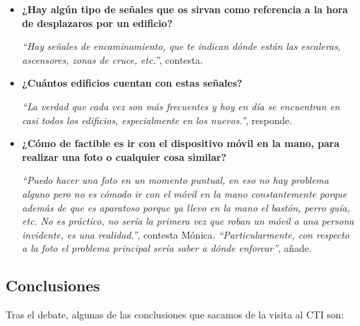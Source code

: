 \begin{itemize}
	\item \textbf{¿Hay algún tipo de señales que os sirvan como referencia a la hora de desplazaros por un edificio?}
	
	\textit{``Hay señales de encaminamiento, que te indican dónde están las escaleras, ascensores, zonas de cruce, etc.''}, contesta.

	\item \textbf{¿Cuántos edificios cuentan con estas señales?}
	
	\textit{``La verdad que cada vez son más frecuentes y hoy en día se encuentran en casi todos los edificios, especialmente en los nuevos.''}, responde.
	
	\item \textbf{¿Cómo de factible es ir con el dispositivo móvil en la mano, para realizar una foto o cualquier cosa similar?}
	
	\textit{``Puedo hacer una foto en un momento puntual, en eso no hay problema alguno pero no es cómodo ir con el móvil en la mano constantemente porque además de que es aparatoso porque ya llevo en la mano el bastón, perro guía, etc. No es práctico, no sería la primera vez que roban un móvil a una persona invidente, es una realidad.''}, contesta Mónica. \textit{``Particularmente, con respecto a la foto el problema principal sería saber a dónde enforcar''}, añade.
	
\end{itemize}

\subsection{Conclusiones}
Tras el debate, algunas de las conclusiones que sacamos de la visita al CTI son:

